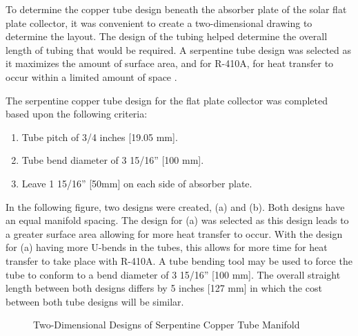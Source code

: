 To determine the copper tube design beneath the absorber plate of the solar flat plate collector, it was convenient to create a two-dimensional drawing to determine the layout. The design of the tubing helped determine the overall length of tubing that would be required. A serpentine tube design was selected as it maximizes the amount of surface area, and for R-410A, for heat transfer to occur within a limited amount of space \cite{serpentine_bending}.

\medskip
The serpentine copper tube design for the flat plate collector was completed based upon the following criteria:

\medskip
\begin{enumerate}[itemsep=3mm, parsep=-1mm, label=\roman*.]
    \item Tube pitch of 3/4 inches [19.05 mm].
    \item Tube bend diameter of 3 15/16” [100 mm].
    \item Leave 1 15/16” [50mm] on each side of absorber plate.
\end{enumerate}

\medskip
In the following figure, two designs were created, (a) and (b). Both designs have an equal manifold spacing. The design for (a) was selected as this design leads to a greater surface area allowing for more heat transfer to occur. With the design for (a) having more U-bends in the tubes, this allows for more time for heat transfer to take place with R-410A. A tube bending tool may be used to force the tube to conform to a bend diameter of 3 15/16” [100 mm]. The overall straight length between both designs differs by 5 inches [127 mm] in which the cost between both tube designs will be similar.

\newpage
\begin{figure}[ht]
    \centering
    \qquad
    \caption{Two-Dimensional Designs of Serpentine Copper Tube Manifold}
\end{figure}

